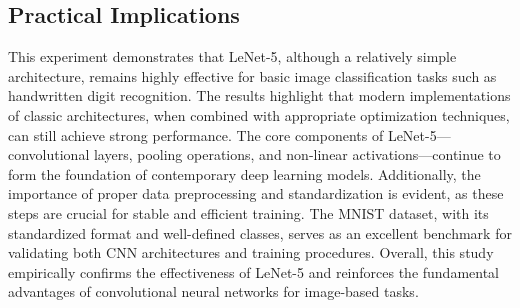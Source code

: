 \documentclass[a4paper, journal]{IEEEtran}
\begin{document}
\subsection{Practical Implications}

This experiment demonstrates that LeNet-5, although a relatively simple architecture, remains highly effective for basic image classification tasks such as handwritten digit recognition. The results highlight that modern implementations of classic architectures, when combined with appropriate optimization techniques, can still achieve strong performance. The core components of LeNet-5—convolutional layers, pooling operations, and non-linear activations—continue to form the foundation of contemporary deep learning models. Additionally, the importance of proper data preprocessing and standardization is evident, as these steps are crucial for stable and efficient training. The MNIST dataset, with its standardized format and well-defined classes, serves as an excellent benchmark for validating both CNN architectures and training procedures. Overall, this study empirically confirms the effectiveness of LeNet-5 and reinforces the fundamental advantages of convolutional neural networks for image-based tasks.
\balance


\end{document}
